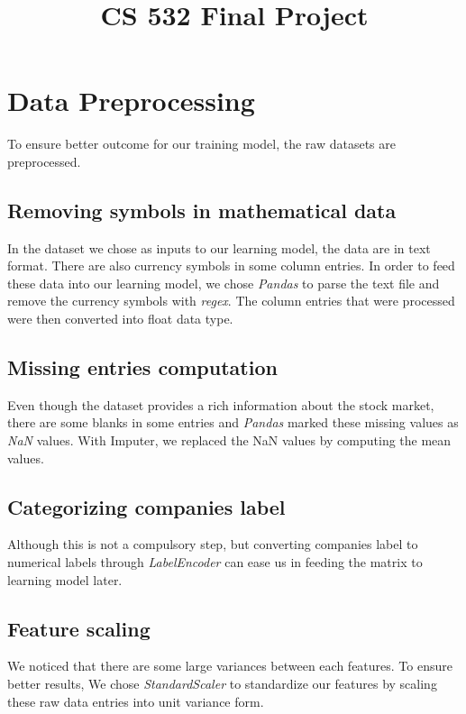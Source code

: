\documentclass{article}
\title{CS 532 Final Project}
\author{
  Shi Ji Chew\thanks
  CS 532 Fall 2017\\
  Department of Computer Science\\
  University of Wisconsin-Madison\\
  Madison, WI 53703 \\
  \texttt{schew2@wisc.edu} \\
  \AND 
  Josh McGrath\thanks
  CS 532 Fall 2017\\
  Department of Computer Science\\
  University of Wisconsin-Madison\\
  Madison, WI 53703\\
  \texttt{jmcgrath4@wisc.edu} \\
  \AND 
  Eli Schlossberg\thanks
  CS 532 Fall 2017\\
  Department of Computer Science\\
  University of Wisconsin-Madison\\
  Madison, WI 53703\\
  \texttt{schlossberg2@wisc.edu}
}
\begin{document}

\maketitle

\section{Data Preprocessing}

To ensure better outcome for our training model, the raw datasets are preprocessed.

\subsection{Removing symbols in mathematical data}

In the dataset we chose as inputs to our learning model, the data are in text format. There are also currency symbols in some column entries. In order to feed these data into our learning model, we chose \emph{Pandas} to parse the text file and remove the currency symbols with \emph{regex}. The column entries that were processed were then converted into float data type.

\subsection{Missing entries computation}
Even though the dataset provides a rich information about the stock market, there are some blanks in some entries and \emph{Pandas} marked these missing values as \emph{NaN} values. With Imputer, we replaced the NaN values by computing the mean values.

\subsection{Categorizing companies label}
Although this is not a compulsory step, but converting companies label to numerical labels through \emph{LabelEncoder} can ease us in feeding the matrix to learning model later.

\subsection{Feature scaling}

We noticed that there are some large variances between each features. To ensure better results, We chose \emph{StandardScaler} to standardize our features by scaling these raw data entries into unit variance form.
\end{document}
